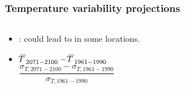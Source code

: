 \begin{frame}
\frametitle{Temperature variability projections}

\begin{columns}

  \begin{column}{0.35\linewidth}

  \vspace*{-2em}
  \begin{itemize}

  \item \citet{schar04}:  could lead to
   in some locations.

  \item {} \newline \vspace*{-1em}
  $\overline{\!T\,}^{{}}_{2071-2100}-\overline{\!T\,}^{{}}_{1961-1990}$ \\[1.5em]

   \newline \vspace*{-0.5em}
  $\dfrac{\sigma_{\!T,2071-2100}-\sigma_{\!T,1961-1990}}{\sigma_{\!T,1961-1990}}$ 

  \end{itemize}

  \end{column}
  
  \begin{column}{0.6\linewidth}

  \vspace*{-0.6em}
  \hspace*{0.7em}


  \end{column}

\end{columns}

\end{frame}

